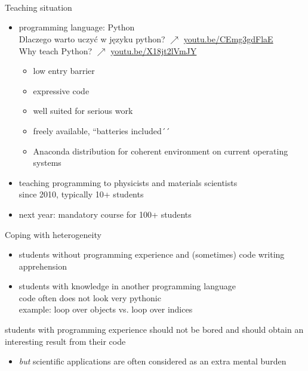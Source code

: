 \documentclass[svgnames]{beamer}
\newcommand\but{\alert{\textit{but}} }
\begin{document}
\begin{frame}[t]
 \vspace{1.5truecm}
 \begin{center}
  \\[0.2truecm]
  \\[0.8truecm]
  \\[0.1truecm]
 \end{center}
\end{frame}

\begin{frame}{Teaching situation}
 \begin{itemize}
  \item programming language: Python\\
	{\small Dlaczego warto uczyć w języku python? {\scriptsize$\nearrow$} \url{youtu.be/CEmg3gdFlaE}}\\
	{\small Why teach Python? {\scriptsize$\nearrow$} \url{youtu.be/X18jt2lVmJY}}
        \begin{itemize}
	 \item low entry barrier
	 \item expressive code
	 \item well suited for serious work
	 \item freely available, ``batteries included´´
         \item Anaconda distribution for coherent environment on
	       current operating systems
	\end{itemize}
  \item teaching programming to physicists and materials scientists\\
	since 2010, typically 10+ students
  \item next year: mandatory course for 100+ students
 \end{itemize}

\end{frame}

\begin{frame}{Coping with heterogeneity}
 \begin{itemize}
  \item students without programming experience and (sometimes) code writing apprehension
  \item students with knowledge in another programming language\\
	code often does not look very pythonic\\
	example: loop over objects vs. loop over indices
 \end{itemize}

 students with programming experience should not be bored and should obtain an interesting
 result from their code

 \begin{itemize}
  \item \but scientific applications are often considered as an extra mental burden
 \end{itemize}
\end{frame}
\end{document}
